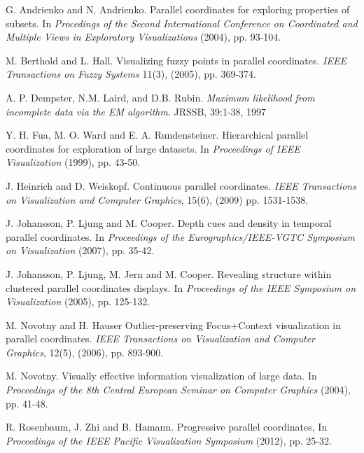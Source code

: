 \documentclass[10pt,a4paper]{article}
\begin{document}
\begin{thebibliography}{9}

  G. Andrienko and N. Andrienko.
  Parallel coordinates for exploring properties of subsets.
  In \emph{Procedings of the Second International Conference on Coordinated and Multiple Views in Exploratory Visualizations} (2004),
  pp. 93-104.

  M. Berthold and L. Hall.
  Visualizing fuzzy points in parallel coordinates.
  \emph{IEEE Transactions on Fuzzy Systems} 11(3), (2005),
  pp. 369-374.

  A. P. Dempster, N.M. Laird, and D.B. Rubin.
  \emph{Maximum likelihood from incomplete data via the EM algorithm}.
  JRSSB, 39:1-38,
  1997

  Y. H. Fua, M. O. Ward and E. A. Rundensteiner.
  Hierarchical parallel coordinates for exploration of large datasets.
  In \emph {Proceedings of IEEE Visualization} (1999),
  pp. 43-50.
  
  J. Heinrich and D. Weiskopf.
  Continuous parallel coordinates.
  \emph{IEEE Transactions on Visualization and Computer Graphics}, 15(6), (2009)
  pp. 1531-1538.
  
  J. Johansson, P. Ljung and  M. Cooper.
  Depth cues and density in temporal parallel coordinates.
  In \emph{Proceedings of the Eurographics/IEEE-VGTC Symposium on Visualization} (2007),
  pp. 35-42.
  
  J. Johansson, P. Ljung, M. Jern and  M. Cooper.
  Revealing structure within clustered parallel coordinates displays.
  In \emph{Proceedings of the IEEE Symposium on Visualization} (2005),
  pp. 125-132.
  
  M. Novotny and H. Hauser
  Outlier-preserving Focus+Context visualization in parallel coordinates.
  \emph{IEEE Transactions on Visualization and Computer Graphics}, 12(5), (2006),
  pp. 893-900.
  
  M. Novotny.
  Visually effective information visualization  of large data.
  In \emph{Proceedings of the 8th Central European Seminar on Computer Graphics} (2004),
  pp. 41-48.
  
  R. Rosenbaum, J. Zhi and B. Hamann.
  Progressive parallel coordinates,
  In \emph{Proceedings of the IEEE Pacific Visualization Symposium} (2012),
  pp. 25-32.
  

  


\end{thebibliography}
\end{document}
